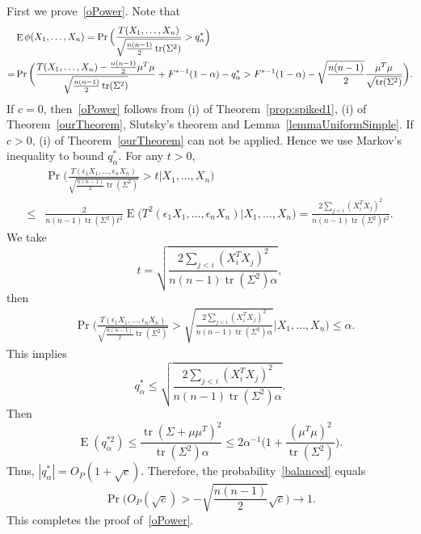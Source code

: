 \documentclass[3p]{elsarticle}
\DeclareMathOperator{\mytr}{tr}
\DeclareMathOperator{\myE}{E}
\theoremstyle{plain}
\theoremstyle{definition}
\theoremstyle{remark}
\begin{document}
First we prove~\eqref{oPower}.
    Note that
    \begin{align}
        &\myE \phi(X_1,\ldots, X_n)=\Pr\Big(\frac{T( X_1,\ldots, X_n)}{\sqrt{\frac{n(n-1)}{2}\mytr(\Sigma^2)}}>q_{\alpha}^* \Big)\notag
        \\
            =&
            \Pr\bigg(\frac{T( X_1,\ldots, X_n)-\frac{n(n-1)}{2}\mu^T\mu}{\sqrt{\frac{n(n-1)}{2}\mytr(\Sigma^2)}}+F^{*-1}(1-\alpha)-q_{\alpha}^*>
F^{*-1}(1-\alpha)
            -\sqrt{\frac{n(n-1)}{2}}\frac{\mu^T\mu}{\sqrt{\mytr(\Sigma^2)}} \bigg).
            \label{balanced}
    \end{align}
    If $c=0$, then~\eqref{oPower} follows from (i) of Theorem~\ref{prop:spiked1}, (i) of Theorem~\ref{ourTheorem}, Slutsky's theorem and Lemma~\ref{lemmaUniformSimple}.
    If $c>0$, (i) of Theorem~\ref{ourTheorem} can not be applied. Hence we use Markov's inequality to bound $q^*_{\alpha}$.
    For any $t>0$,
    $$
    \begin{aligned}
        &\Pr\bigg(\frac{T(\epsilon_1 X_1,\ldots, \epsilon_n X_n)}{\sqrt{\frac{n(n-1)}{2}\mytr(\Sigma^2)}}>t\bigg| X_1,\ldots,X_n\bigg)
        \\
        \leq &
       \frac{2}{{n(n-1)}\mytr(\Sigma^2) t^2}  \myE\big(T^2(\epsilon_1 X_1,\ldots, \epsilon_n X_n)\big| X_1,\ldots,X_n\big)
        =\frac{2\sum_{j<i}(X_i^T X_j)^2}{{n(n-1)}\mytr(\Sigma^2) t^2}.
    \end{aligned}
    $$
    We take
    $$t=
    \sqrt{
        \frac{2\sum_{j<i}(X_i^T X_j)^2}{{n(n-1)}\mytr(\Sigma^2) \alpha}
    },
    $$
    then
    $$
    \begin{aligned}
        &\Pr\bigg(\frac{T(\epsilon_1 X_1,\ldots, \epsilon_n X_n)}{\sqrt{\frac{n(n-1)}{2}\mytr(\Sigma^2)}}>
\sqrt{\frac{2\sum_{j<i}(X_i^T X_j)^2}{{n(n-1)}\mytr(\Sigma^2) \alpha}}
        \bigg| X_1,\ldots,X_n\bigg)
        \leq 
        \alpha.
    \end{aligned}
    $$
    This implies
    $$
    q_{\alpha}^*\leq
\sqrt{\frac{2\sum_{j<i}(X_i^T X_j)^2}{{n(n-1)}\mytr(\Sigma^2) \alpha}}.
    $$
    Then
    $$
   \myE (q_{\alpha}^{*2})\leq  \frac{\mytr(\Sigma+\mu\mu^T)^2}{\mytr(\Sigma^2)\alpha}\leq  2\alpha^{-1} \Big(1+\frac{(\mu^T \mu)^2}{\mytr(\Sigma^2)}\Big).
    $$
    Thus, $|q_{\alpha}^{*}|=O_P(1+\sqrt{c})$.
    Therefore, the probability~\eqref{balanced} equals
    $$
    \Pr\Big(O_P(\sqrt{c})>-\sqrt{\frac{n(n-1)}{2}}\sqrt{c}\Big)\to 1.
    $$
This completes the proof of~\eqref{oPower}.
\end{document}
